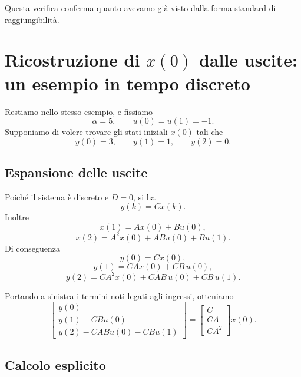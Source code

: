\bigskip

Questa verifica conferma quanto avevamo già visto dalla forma standard di raggiungibilità.

\section{Ricostruzione di \(x(0)\) dalle uscite: un esempio in tempo discreto}

Restiamo nello stesso esempio, e fissiamo
\[
\alpha=5,
\qquad
u(0)=u(1)=-1.
\]
Supponiamo di volere trovare gli stati iniziali \(x(0)\) tali che
\[
y(0)=3,\qquad y(1)=1,\qquad y(2)=0.
\]

\subsection{Espansione delle uscite}

Poiché il sistema è discreto e \(D=0\), si ha
\[
y(k)=Cx(k).
\]
Inoltre
\[
x(1)=Ax(0)+Bu(0),
\]
\[
x(2)=A^2x(0)+ABu(0)+Bu(1).
\]
Di conseguenza
\[
y(0)=Cx(0),
\]
\[
y(1)=CAx(0)+CB\,u(0),
\]
\[
y(2)=CA^2x(0)+CAB\,u(0)+CB\,u(1).
\]

Portando a sinistra i termini noti legati agli ingressi, otteniamo
\[
\begin{bmatrix}
y(0)\\
y(1)-CBu(0)\\
y(2)-CABu(0)-CBu(1)
\end{bmatrix}
=
\begin{bmatrix}
C\\
CA\\
CA^2
\end{bmatrix}
x(0).
\]

\subsection{Calcolo esplicito}

